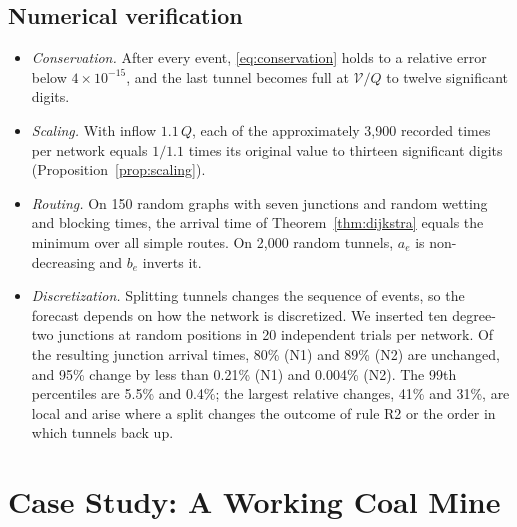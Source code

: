 \documentclass[11pt,a4paper]{article}
\theoremstyle{plain}
\theoremstyle{definition}
\theoremstyle{remark}
\begin{document}
\subsection{Numerical verification}
\begin{itemize}[leftmargin=1.5em, itemsep=2pt, topsep=2pt]
  \item \emph{Conservation.} After every event, \eqref{eq:conservation} holds to a relative error below $4\times10^{-15}$, and the last tunnel becomes full at $\mathcal{V}/Q$ to twelve significant digits.
  \item \emph{Scaling.} With inflow $1.1\,Q$, each of the approximately 3{,}900 recorded times per network equals $1/1.1$ times its original value to thirteen significant digits (Proposition~\ref{prop:scaling}).
  \item \emph{Routing.} On 150 random graphs with seven junctions and random wetting and blocking times, the arrival time of Theorem~\ref{thm:dijkstra} equals the minimum over all simple routes. On 2{,}000 random tunnels, $a_e$ is non-decreasing and $b_e$ inverts it.
  \item \emph{Discretization.} Splitting tunnels changes the sequence of events, so the forecast depends on how the network is discretized. We inserted ten degree-two junctions at random positions in 20 independent trials per network. Of the resulting junction arrival times, 80\% (N1) and 89\% (N2) are unchanged, and 95\% change by less than 0.21\% (N1) and 0.004\% (N2). The 99th percentiles are 5.5\% and 0.4\%; the largest relative changes, 41\% and 31\%, are local and arise where a split changes the outcome of rule R2 or the order in which tunnels back up.
\end{itemize}

\section{Case Study: A Working Coal Mine}\label{sec:case}
\end{document}
